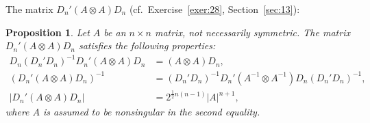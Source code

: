 \documentclass[14pt]{extarticle}
\theoremstyle{plain}
\newtheorem{proposition}{Proposition}
\theoremstyle{definition}
\theoremstyle{remark}
\begin{document}
The matrix $D_n'(A\otimes A)D_n$ (cf.\ Exercise~\ref{exer:28}, Section~\ref{sec:13}):

\begin{proposition}\label{prp:10}
Let $A$ be an $n \times n$ matrix, not necessarily symmetric. The matrix $D_n'(A \otimes A)D_n$ satisfies the following properties:
\begin{align*}
D_n(D_n'D_n)^{-1}D_n'(A \otimes A)D_n &= (A \otimes A)D_n, \\
(D_n'(A \otimes A)D_n)^{-1} &= (D_n'D_n)^{-1} D_n'(A^{-1} \otimes A^{-1})D_n(D_n'D_n)^{-1}, \\
|D_n'(A \otimes A)D_n| &= 2^{\frac{1}{2}n(n-1)} |A|^{n+1},
\end{align*}
where $A$ is assumed to be nonsingular in the second equality.
\end{proposition}
\end{document}
